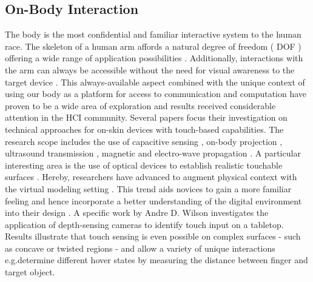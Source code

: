 \subsection{On-Body Interaction}
\label{subsec:body}
The body is the most confidential and familiar interactive system to the human race.
The skeleton of a human arm affords a natural degree of freedom ( DOF ) offering a wide range of application possibilities \cite{Harrison:2012:OIA:2148131.2148148}. Additionally, interactions with the arm can always be accessible without the need for visual awareness to the target device \cite{Gustafson:2013:UPI:2470654.2466114}.
This always-available aspect combined with the unique context of using our body as a platform for access to communication and computation have proven to be a wide area of exploration \cite{Harrison:2011:OWM:2047196.2047255, Harrison:2010:SAB:1753326.1753394, Nittala:2018:MST:3173574.3173607, Dezfuli:2012:PIP:2325616.2325623, Gustafson:2011:IPL:2047196.2047233} and results received considerable attention in the HCI community.\newpara
Several papers focus their investigation on technical approaches for on-skin devices with touch-based capabilities. The research scope includes the use of capacitive sensing \cite{Kao:2016:DRP:2971763.2971777,Weigel:2015:IFS:2702123.2702391, Kao:2015:NFI:2702123.2702572}, on-body projection \cite{Harrison:2011:OWM:2047196.2047255, Harrison:2010:SAB:1753326.1753394, Xiao:2018:LOP:3173574.3173669}, ultrasound transmission \cite{Mujibiya:2013:STO:2512349.2512821}, magnetic \cite{Chan:2013:FPS:2501988.2502016} and electro-wave propagation \cite{Zhang:2016:SUB:2858036.2858082}. A particular interesting area is the use of optical devices to establish realistic touchable surfaces \cite{Harrison:2011:OWM:2047196.2047255}.\label{subsec:camera}
Hereby, researchers have advanced to augment physical context with the virtual modeling setting \cite{Leithinger:2011:DGI:2047196.2047268, Follmer:2012:KDR:2207676.2208403, Follmer:2010:CRP:1866218.1866230}. This trend aids novices to gain a more familiar feeling and hence incorporate a better understanding of the digital environment into their design \cite{Gannon:2015:TSA:2702123.2702581}.
A specific work by Andre D. Wilson \cite{Wilson:2010:UDC:1936652.1936665} investigates the application of depth-sensing cameras to identify touch input on a tabletop. Results illustrate that touch sensing is even possible on complex surfaces - such as concave or twisted regions - and allow a variety of unique interactions e.g.\;determine different hover states by measuring the distance between finger and target object.
